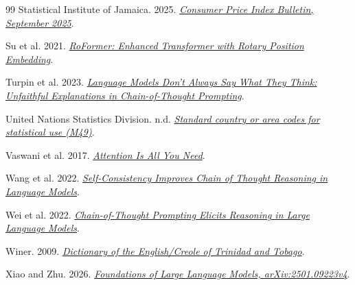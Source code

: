 \begin{thebibliography}{99}
Statistical Institute of Jamaica. 2025. \href{https://statinja.gov.jm/pdfproxythumbnail.ashx?u=https\%3A\%2F\%2Fwups.statinja.gov.jm\%2FWUP\%2F2025Monthly+Publications_CPI+Bulletin+September+2025.pdf_STATINJa.pdf}{\emph{Consumer Price Index Bulletin, September 2025}}.

Su et al. 2021. \href{https://arxiv.org/abs/2104.09864}{\emph{RoFormer: Enhanced Transformer with Rotary Position Embedding}}.

Turpin et al. 2023. \href{https://arxiv.org/abs/2305.04388}{\emph{Language Models Don't Always Say What They Think: Unfaithful Explanations in Chain-of-Thought Prompting}}.

United Nations Statistics Division. n.d. \href{https://unstats.un.org/unsd/methodology/m49/}{\emph{Standard country or area codes for statistical use (M49)}}.

Vaswani et al. 2017. \href{https://arxiv.org/abs/1706.03762}{\emph{Attention Is All You Need}}.

Wang et al. 2022. \href{https://arxiv.org/abs/2203.11171}{\emph{Self-Consistency Improves Chain of Thought Reasoning in Language Models}}.

Wei et al. 2022. \href{https://arxiv.org/abs/2201.11903}{\emph{Chain-of-Thought Prompting Elicits Reasoning in Large Language Models}}.

Winer. 2009. \href{https://www.mcgill.ca/dise/personnes/academicstaff/winer}{\emph{Dictionary of the English/Creole of Trinidad and Tobago}}.

Xiao and Zhu. 2026. \href{https://arxiv.org/abs/2501.09223v4}{\emph{Foundations of Large Language Models, arXiv:2501.09223v4}}.
\end{thebibliography}
